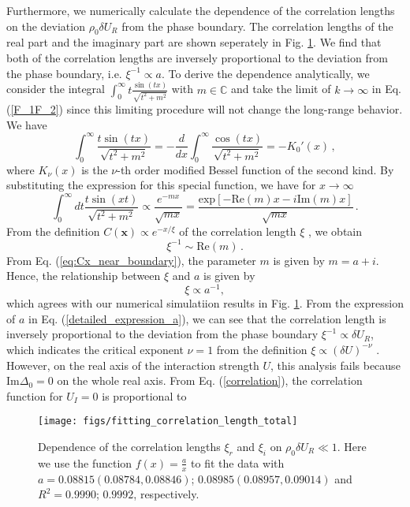 \documentclass[aps,prl,twocolumn,nofootinbib,superscriptaddress,longbibliography]{revtex4-1}
\begin{document}
Furthermore, we numerically calculate the dependence of the correlation lengths on the deviation
$\rho_{0}\delta U_{R}$ from the phase boundary. The correlation lengths of the real part and the imaginary
part are shown seperately in Fig. \ref{fig3}. We find that both of the correlation lengths are inversely proportional to the deviation from the phase boundary, i.e. $\xi^{-1}\propto a$. To derive the dependence analytically, we consider the integral $\int_0^{\infty}t\frac{\sin(tx)}{\sqrt{t^2+m^2}}$ with $m\in\mathbb{C}$ and take the limit of $k\to\infty$ in Eq. (\ref{F_1F_2}) since this limiting procedure will not change the long-range behavior. We have
\begin{equation}
   \int_0^{\infty}\frac{t\sin(tx)}{\sqrt{t^2+m^2}}=-\frac{d}{dx}\int_0^{\infty}\frac{\cos(tx)}{\sqrt{t^2+m^2}}=-K_0'(x)\,,
\end{equation}
where $K_{\nu}(x)$ is the $\nu$-th order modified Bessel function of the second kind. By substituting the expression for this special function, we have for $x\rightarrow\infty$
\begin{equation}
\int_{0}^{\infty}dt\frac{t\sin(xt)}{\sqrt{t^{2}+m^{2}}}\propto \frac{e^{-mx}}{\sqrt{mx}}= \frac{\text{exp}[-\text{Re}(m)x-i\text{Im}(m)x]}{\sqrt{mx}}\,.
\end{equation}
From the definition $C(\bm{x})\propto e^{-x/\xi}$ of the correlation length $\xi$ \cite{Sachdev:2011uj}, we obtain
\begin{equation}
    \xi^{-1}\sim\text{Re}(m)\,.
\end{equation}
From Eq. (\ref{eq:Cx_near_boundary}), the parameter $m$ is given by $m=a+i$. Hence, the relationship between $\xi$ and $a$ is given by
\begin{equation}
  \xi\propto a^{-1},\label{corre_length}
\end{equation}
which agrees with our numerical simulatiion results in Fig. \ref{fig3}. From the expression of $a$ in Eq. (\ref{detailed_expression_a}), we can see that the correlation length is inversely proportional to the deviation from the phase boundary $\xi^{-1}\propto\delta U_R$, which indicates the critical exponent $\nu=1$ from the definition $\xi\propto(\delta U)^{-\nu}$ \cite{Sachdev:2011uj}. However, on the real axis of the interaction strength $U$, this analysis fails because $\text{Im}\Delta_0=0$ on the whole real axis. From Eq. (\ref{correlation}),  the correlation function for $U_I=0$ is proportional to
\begin{figure}
	\centering \texttt{[image: figs/fitting\_correlation\_length\_total]}
	\caption{Dependence of the correlation lengths $\xi_r$ and $\xi_i$ on $\rho_{0}\delta U_{R}\ll1$. Here we use the function $f(x)=\frac{a}{x}$ to fit the data with
		$a=0.08815(0.08784,0.08846)$; $0.08985(0.08957,0.09014)$ and $R^{2}=0.9990$;
		$0.9992$, respectively.}
	\label{fig3}
\end{figure}
\end{document}
